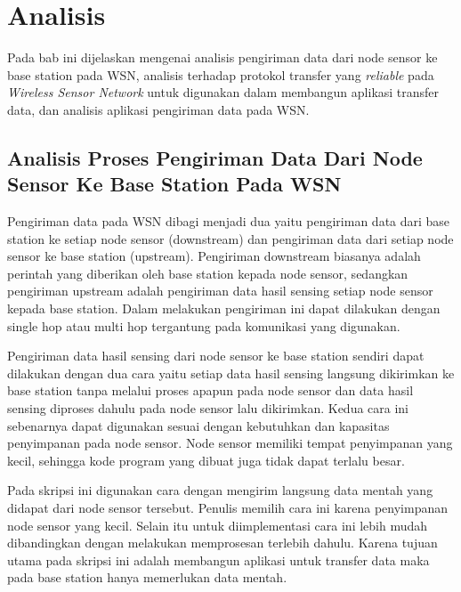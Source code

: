 \chapter{Analisis}
\label{chap:analisis}

Pada bab ini dijelaskan mengenai analisis pengiriman data dari node sensor ke base station pada WSN, analisis terhadap protokol transfer yang \textit{reliable} pada \textit{Wireless Sensor Network} untuk digunakan dalam membangun aplikasi transfer data, dan analisis aplikasi pengiriman data pada WSN.

\section{Analisis Proses Pengiriman Data Dari Node Sensor Ke Base Station Pada WSN}
Pengiriman data pada WSN dibagi menjadi dua yaitu pengiriman data dari base station ke setiap node sensor (downstream) dan pengiriman data dari setiap node sensor ke base station (upstream). Pengiriman downstream biasanya adalah perintah yang diberikan oleh base station kepada node sensor, sedangkan pengiriman upstream adalah pengiriman data hasil sensing setiap node sensor kepada base station. Dalam melakukan pengiriman ini dapat dilakukan dengan single hop atau multi hop tergantung pada komunikasi yang digunakan. 

Pengiriman data hasil sensing dari node sensor ke base station sendiri dapat dilakukan dengan dua cara yaitu setiap data hasil sensing langsung dikirimkan ke base station tanpa melalui proses apapun pada node sensor dan data hasil sensing diproses dahulu pada node sensor lalu dikirimkan. Kedua cara ini sebenarnya dapat digunakan sesuai dengan kebutuhkan dan kapasitas penyimpanan pada node sensor. Node sensor memiliki tempat penyimpanan yang kecil, sehingga kode program yang dibuat juga tidak dapat terlalu besar. 

Pada skripsi ini digunakan cara dengan mengirim langsung data mentah yang didapat dari node sensor tersebut. Penulis memilih cara ini karena penyimpanan node sensor yang kecil. Selain itu untuk diimplementasi cara ini lebih mudah dibandingkan dengan melakukan memprosesan terlebih dahulu. Karena tujuan utama pada skripsi ini adalah membangun aplikasi untuk transfer data maka pada base station hanya memerlukan data mentah.

